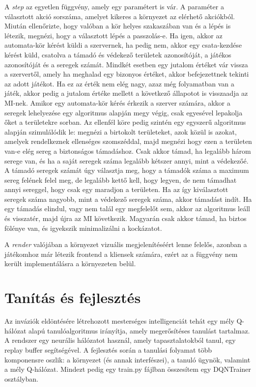 \documentclass[
]{thesis-ekf}
\theoremstyle{definition}
\theoremstyle{remark}
\begin{document}
	A \emph{step} az egyetlen függvény, amely egy paramétert is vár. A paraméter a választott akció sorszáma, amelyet kikeres a környezet az elérhető akciókból. Miután ellenőrizte, hogy valóban a kör helyes szakaszában van és a lépés is létezik, megnézi, hogy a választott lépés a passzolás-e. Ha igen, akkor az automata-kör kérést küldi a szervernek, ha pedig nem, akkor egy csata-kezdése kérést küld, csatolva a támadó és védekező területek azonosítóját, a játékos azonosítóját és a seregek számát. Mindkét esetben egy jutalom értéket vár vissza a szervertől, amely ha meghalad egy bizonyos értéket, akkor befejezettnek tekinti az adott játékot. Ha ez az érték nem elég nagy, azaz még folyamatban van a játék, akkor pedig a jutalom értéke mellett a következő állapotot is visszaadja az MI-nek. Amikor egy automata-kör kérés érkezik a szerver számára, akkor a seregek lehelyezése egy algoritmus alapján megy végig, csak egyesével lepakolja őket a területekre sorban. Az ellenfél köre pedig szintén egy egyszerű algoritmus alapján szimulálódik le: megnézi a birtokolt területeket, azok közül is azokat, amelyek rendelkeznek ellenséges szomszéddal, majd megnézi hogy ezen a területen van-e elég sereg a biztonságos támadáshoz. Csak akkor támad, ha legalább három serege van, és ha a saját seregek száma legalább kétszer annyi, mint a védekezőé. A támadó seregek számát úgy választja meg, hogy a támadók száma a maximum sereg felének felel meg, de legalább kettő kell, hogy legyen, de nem támadhat annyi sereggel, hogy csak egy maradjon a területen. Ha az így kiválasztott seregek száma nagyobb, mint a védekező seregek száma, akkor támadást indít. Ha egy támadás elindul, vagy nem talál egy megfelelőt sem, akkor az algoritmus leáll és visszatér, majd újra az MI következik. Magyarán csak akkor támad, ha biztos fölénye van, és igyekszik minimalizálni a kockázatot.
	
	A \emph{render} valójában a környezet vizuális megjelenítéséért lenne felelős, azonban a játékomhoz már létezik frontend a kliensek számára, ezért az a függvény nem került implementálásra a környezeten belül.
	
	\section{Tanítás és fejlesztés}
	
	Az inváziók eldöntésére létrehozott mesterséges intelligenciát tehát egy mély Q-hálózat alapú tanulóalgoritmus irányítja, amely megerősítéses tanulást tartalmaz. A rendszer egy neurális hálózatot használ, amely tapasztalatokból tanul, egy replay buffer segítségével. A fejlesztés során a tanulási folyamat több komponensre oszlik: a környezet (és annak interfészei), a tanuló ügynök, valamint a mély Q-hálózat. Mindezt pedig egy train.py fájlban összesítem egy DQNTrainer osztályban.
	
\end{document}
